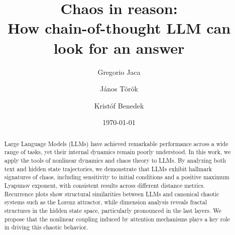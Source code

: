 \documentclass[aip%
 aip,
 amsmath,amssymb,
 reprint,%
]{revtex4-1}
\begin{document}

\title[Chaos in reason]{Chaos in reason:\\How chain-of-thought LLM can look for an answer}

\author{Gregorio Jaca}
\author{János Török}%


\author{Kristóf Benedek}
%

\date{\today}%

\begin{abstract}
Large Language Models (LLMs) have achieved remarkable performance across a wide range of tasks, yet their internal dynamics remain poorly understood. In this work, we apply the tools of nonlinear dynamics and chaos theory to LLMs. By analyzing both text and hidden state trajectories, we demonstrate that LLMs exhibit hallmark signatures of chaos, including sensitivity to initial conditions and a positive maximum Lyapunov exponent, with consistent results across different distance metrics. Recurrence plots show structural similarities between LLMs and canonical chaotic systems such as the Lorenz attractor, while dimension analysis reveals fractal structures in the hidden state space, particularly pronounced in the last layers. We propose that the nonlinear coupling induced by attention mechanisms plays a key role in driving this chaotic behavior. 
\end{abstract}

\maketitle
\end{document}
